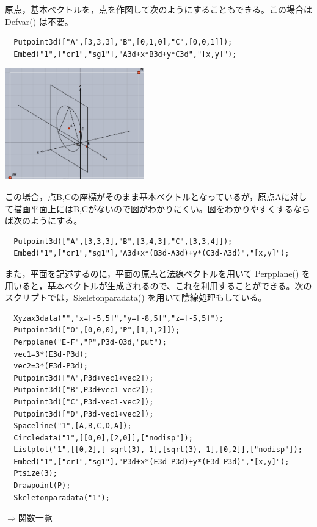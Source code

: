 \documentclass[papersize,a4paper,12pt,uplatex]{jsarticle}
\begin{document}
\begin{description}
原点，基本ベクトルを，点を作図して次のようにすることもできる。この場合は Defvar() は不要。

\begin{verbatim}
  Putpoint3d(["A",[3,3,3],"B",[0,1,0],"C",[0,0,1]]);
  Embed("1",["cr1","sg1"],"A3d+x*B3d+y*C3d","[x,y]");
\end{verbatim}
\begin{center}
\includegraphics[bb=0 0 477.02 383.02 , width=6cm]{Fig/embed03.pdf}
\end{center}

この場合，点B,Cの座標がそのまま基本ベクトルとなっているが，原点Aに対して描画平面上にはB,Cがないので図がわかりにくい。図をわかりやすくするならば次のようにする。
\begin{verbatim}
  Putpoint3d(["A",[3,3,3],"B",[3,4,3],"C",[3,3,4]]);
  Embed("1",["cr1","sg1"],"A3d+x*(B3d-A3d)+y*(C3d-A3d)","[x,y]");
\end{verbatim}

  また，平面を記述するのに，平面の原点と法線ベクトルを用いて Perpplane() を用いると，基本ベクトルが生成されるので、これを利用することができる。次のスクリプトでは，Skeletonparadata() を用いて陰線処理もしている。
\begin{verbatim}
  Xyzax3data("","x=[-5,5]","y=[-8,5]","z=[-5,5]");
  Putpoint3d(["O",[0,0,0],"P",[1,1,2]]);
  Perpplane("E-F","P",P3d-O3d,"put");
  vec1=3*(E3d-P3d);
  vec2=3*(F3d-P3d);
  Putpoint3d(["A",P3d+vec1+vec2]);
  Putpoint3d(["B",P3d+vec1-vec2]);
  Putpoint3d(["C",P3d-vec1-vec2]);
  Putpoint3d(["D",P3d-vec1+vec2]);
  Spaceline("1",[A,B,C,D,A]);
  Circledata("1",[[0,0],[2,0]],["nodisp"]);
  Listplot("1",[[0,2],[-sqrt(3),-1],[sqrt(3),-1],[0,2]],["nodisp"]);
  Embed("1",["cr1","sg1"],"P3d+x*(E3d-P3d)+y*(F3d-P3d)","[x,y]");
  Ptsize(3);
  Drawpoint(P);
  Skeletonparadata("1");
\end{verbatim}
         \begin{center}  \end{center}

\begin{flushright} \hyperlink{functionlist}{$\Rightarrow$関数一覧}\end{flushright}



\end{description}
\end{document}
